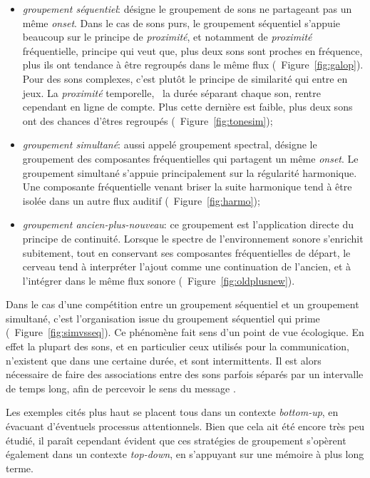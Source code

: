 \begin{itemize}
\item \emph{groupement séquentiel}: désigne le groupement de sons ne partageant pas un même \emph{onset}. Dans le cas de sons purs, le groupement séquentiel s'appuie beaucoup sur le principe de \emph{proximité}, et notamment de \emph{proximité} fréquentielle, principe qui veut que, plus deux sons sont proches en fréquence, plus ils ont tendance à être regroupés dans le même flux (\cf~Figure~\ref{fig:galop}). Pour des sons complexes, c'est plutôt le principe de similarité qui entre en jeux. La \emph{proximité} temporelle, \ie~la durée séparant chaque son, rentre cependant en ligne de compte. Plus cette dernière est faible, plus deux sons ont des chances d'êtres regroupés (\cf~Figure~\ref{fig:tonesim});
\item \emph{groupement simultané}: aussi appelé groupement spectral, désigne le groupement des composantes fréquentielles qui partagent un même \emph{onset}. Le groupement simultané s'appuie principalement sur la régularité harmonique. Une composante fréquentielle venant briser la suite harmonique tend à être isolée dans un autre flux auditif (\cf~Figure~\ref{fig:harmo});
\item \emph{groupement ancien-plus-nouveau}: ce groupement est l'application directe du principe de continuité. Lorsque le spectre de l'environnement sonore s'enrichit subitement, tout en conservant ses composantes fréquentielles de départ, le cerveau tend à interpréter l'ajout comme une continuation de l'ancien, et à l'intégrer dans le même flux sonore (\cf~Figure~\ref{fig:oldplusnew}).
\end{itemize}

Dans le cas d'une compétition entre un groupement séquentiel et un groupement simultané, c'est l'organisation issue du groupement séquentiel qui prime (\cf~Figure~\ref{fig:simvsseq}). Ce phénomène fait sens d'un point de vue écologique. En effet la plupart des sons, et en particulier ceux utilisés pour la communication, n'existent que dans une certaine durée, et sont intermittents. Il est alors nécessaire de faire des associations entre des sons parfois séparés par un intervalle de temps long, afin de percevoir le sens du message \citep{winkler2009modeling}.

Les exemples cités plus haut se placent tous dans un contexte \emph{bottom-up}, en évacuant d'éventuels processus attentionnels. Bien que cela ait été encore très peu étudié, il paraît cependant évident que ces stratégies de groupement s’opèrent également dans un contexte \emph{top-down}, en s'appuyant sur une mémoire à plus long terme.


